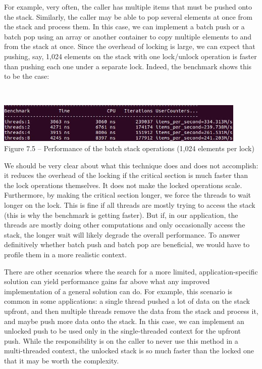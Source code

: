 For example, very often, the caller has multiple items that must be pushed onto the stack. Similarly, the caller may be able to pop several elements at once from the stack and process them. In this case, we can implement a batch push or a batch pop using an array or another container to copy multiple elements to and from the stack at once. Since the overhead of locking is large, we can expect that pushing, say, 1,024 elements on the stack with one lock/unlock operation is faster than pushing each one under a separate lock. Indeed, the benchmark shows this to be the case:

\hspace*{\fill} \\ %
\begin{center}
\includegraphics[width=0.9\textwidth]{content/2/chapter7/images/5.jpg}\\
Figure 7.5 – Performance of the batch stack operations (1,024 elements per lock)
\end{center}

We should be very clear about what this technique does and does not accomplish: it reduces the overhead of the locking if the critical section is much faster than the lock operations themselves. It does not make the locked operations scale. Furthermore, by making the critical section longer, we force the threads to wait longer on the lock. This is fine if all threads are mostly trying to access the stack (this is why the benchmark is getting faster). But if, in our application, the threads are mostly doing other computations and only occasionally access the stack, the longer wait will likely degrade the overall performance. To answer definitively whether batch push and batch pop are beneficial, we would have to profile them in a more realistic context.

There are other scenarios where the search for a more limited, application-specific solution can yield performance gains far above what any improved implementation of a general solution can do. For example, this scenario is common in some applications: a single thread pushed a lot of data on the stack upfront, and then multiple threads remove the data from the stack and process it, and maybe push more data onto the stack. In this case, we can implement an unlocked push to be used only in the single-threaded context for the upfront push. While the responsibility is on the caller to never use this method in a multi-threaded context, the unlocked stack is so much faster than the locked one that it may be worth the complexity.

